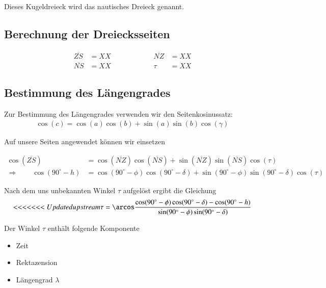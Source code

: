 \begin{refsection}
\begin{refsection}
Dieses Kugeldreieck wird das nautisches Dreieck genannt.


\subsection{Berechnung der Dreiecksseiten}





\begin{align*}
\overline{ZS} &= XX \quad \quad \quad \quad \quad \quad 
\overline{NZ} &= XX \\
\overline{NS} &= XX \quad \quad \quad \quad \quad \quad 
\tau &= XX 
\end{align*} 


\subsection{Bestimmung des Längengrades} \label{BestimmungL} 
Zur Bestimmung des Längengrades verwenden wir den Seitenkosinussatz:
\begin{align*}
\cos(c) = \cos(a)\cos(b) + \sin(a)\sin(b)\cos(\gamma)
\end{align*}

Auf unsere Seiten angewendet können wir einsetzen

\begin{align*}
\cos(\overline{ZS}) &= \cos(\overline{NZ}) \cos(\overline{NS}) + \sin(\overline{NZ}) \sin(\overline{NS}) \cos(\tau) \\
\Rightarrow \quad \quad
\cos(90^{\circ} - h) &= \cos(90^{\circ} - \phi) \cos(90^{\circ} - \delta) + \sin(90^{\circ} - \phi)\sin(90^{\circ} - \delta)\cos(\tau)
\end{align*}

Nach dem uns unbekannten Winkel $\tau$ aufgelöst ergibt die Gleichung
\begin{align*}
<<<<<<< Updated upstream
\tau = \arcos 
\frac{ \cos(90^{\circ} - \phi) \cos(90^{\circ} - \delta) - \cos(90^{\circ} - h)} {\sin(90^{\circ} - \phi)\sin(90^{\circ} - \delta)}
\end{align*}

Der Winkel $\tau$ enthält folgende Komponente
\begin{itemize}
\item Zeit
\item Rektazension
\item Längengrad $\lambda$
\end{itemize}



\end{refsection}
\end{refsection}
